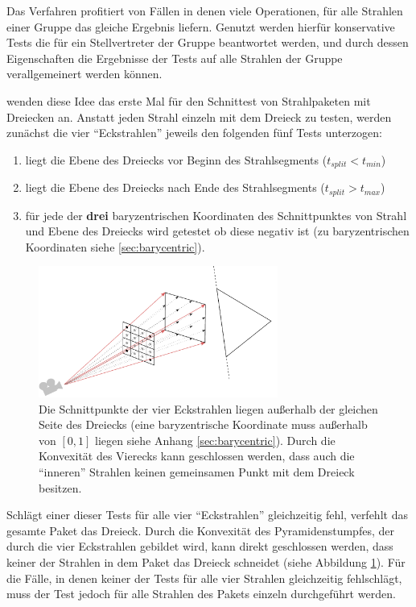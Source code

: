 Das Verfahren profitiert von Fällen in denen viele Operationen, für alle Strahlen einer Gruppe das gleiche Ergebnis liefern. Genutzt werden hierfür konservative Tests die für ein Stellvertreter der Gruppe beantwortet werden, und durch dessen Eigenschaften die Ergebnisse der Tests auf alle Strahlen der Gruppe verallgemeinert werden können.

\cite{DHS04} wenden diese Idee das erste Mal für den Schnittest von Strahlpaketen mit Dreiecken an. Anstatt jeden Strahl einzeln mit dem Dreieck zu testen, werden zunächst die vier ``Eckstrahlen'' jeweils den folgenden fünf Tests unterzogen:
\begin{enumerate}
 \item liegt die Ebene des Dreiecks vor Beginn des Strahlsegments ($t_{split} < t_{min}$)
 \item liegt die Ebene des Dreiecks nach Ende des Strahlsegments ($t_{split} > t_{max}$)
 \item für jede der \textbf{drei} baryzentrischen Koordinaten des Schnittpunktes von Strahl und Ebene des Dreiecks wird getestet ob diese negativ ist (zu baryzentrischen Koordinaten siehe \ref{sec:barycentric}).
\end{enumerate}

\begin{figure}\centering
\includegraphics[width=0.7\textwidth]{images/packetmisstri.pdf} 
\caption[Früher Ausschluss ganzer Strahlpakete]{Die Schnittpunkte der vier Eckstrahlen liegen außerhalb der gleichen Seite des Dreiecks (eine baryzentrische Koordinate muss außerhalb von $[0,1]$ liegen siehe Anhang \ref{sec:barycentric}). Durch die Konvexität des Vierecks kann geschlossen werden, dass auch die ``inneren'' Strahlen keinen gemeinsamen Punkt mit dem Dreieck besitzen.}
\label{fig:packetdismiss}
\end{figure}

Schlägt einer dieser Tests für alle vier ``Eckstrahlen'' gleichzeitig fehl, verfehlt das gesamte Paket das Dreieck. Durch die Konvexität des Pyramidenstumpfes, der durch die vier Eckstrahlen gebildet wird, kann direkt geschlossen werden, dass keiner der Strahlen in dem Paket das Dreieck schneidet (siehe Abbildung \ref{fig:packetdismiss}).
Für die Fälle, in denen keiner der Tests für alle vier Strahlen gleichzeitig fehlschlägt, muss der Test jedoch für alle Strahlen des Pakets einzeln durchgeführt werden.

